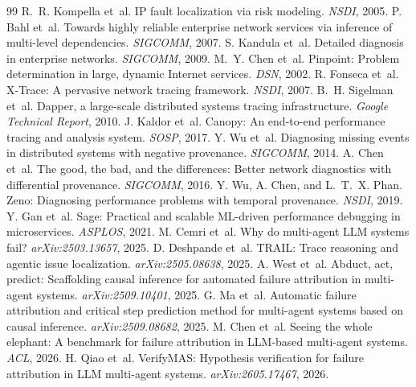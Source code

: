 \documentclass{article}
\begin{document}
\begin{thebibliography}{99}
 R.~R. Kompella et~al. IP fault localization via risk modeling. \emph{NSDI}, 2005.
 P. Bahl et~al. Towards highly reliable enterprise network services via inference of multi-level dependencies. \emph{SIGCOMM}, 2007.
 S. Kandula et~al. Detailed diagnosis in enterprise networks. \emph{SIGCOMM}, 2009.
 M.~Y. Chen et~al. Pinpoint: Problem determination in large, dynamic Internet services. \emph{DSN}, 2002.
 R. Fonseca et~al. X-Trace: A pervasive network tracing framework. \emph{NSDI}, 2007.
 B.~H. Sigelman et~al. Dapper, a large-scale distributed systems tracing infrastructure. \emph{Google Technical Report}, 2010.
 J. Kaldor et~al. Canopy: An end-to-end performance tracing and analysis system. \emph{SOSP}, 2017.
 Y. Wu et~al. Diagnosing missing events in distributed systems with negative provenance. \emph{SIGCOMM}, 2014.
 A. Chen et~al. The good, the bad, and the differences: Better network diagnostics with differential provenance. \emph{SIGCOMM}, 2016.
 Y. Wu, A. Chen, and L.~T.~X. Phan. Zeno: Diagnosing performance problems with temporal provenance. \emph{NSDI}, 2019.
 Y. Gan et~al. Sage: Practical and scalable ML-driven performance debugging in microservices. \emph{ASPLOS}, 2021.
 M. Cemri et~al. Why do multi-agent LLM systems fail? \emph{arXiv:2503.13657}, 2025.
 D. Deshpande et~al. TRAIL: Trace reasoning and agentic issue localization. \emph{arXiv:2505.08638}, 2025.
 A. West et~al. Abduct, act, predict: Scaffolding causal inference for automated failure attribution in multi-agent systems. \emph{arXiv:2509.10401}, 2025.
 G. Ma et~al. Automatic failure attribution and critical step prediction method for multi-agent systems based on causal inference. \emph{arXiv:2509.08682}, 2025.
 M. Chen et~al. Seeing the whole elephant: A benchmark for failure attribution in LLM-based multi-agent systems. \emph{ACL}, 2026.
 H. Qiao et~al. VerifyMAS: Hypothesis verification for failure attribution in LLM multi-agent systems. \emph{arXiv:2605.17467}, 2026.

\end{thebibliography}
\end{document}

